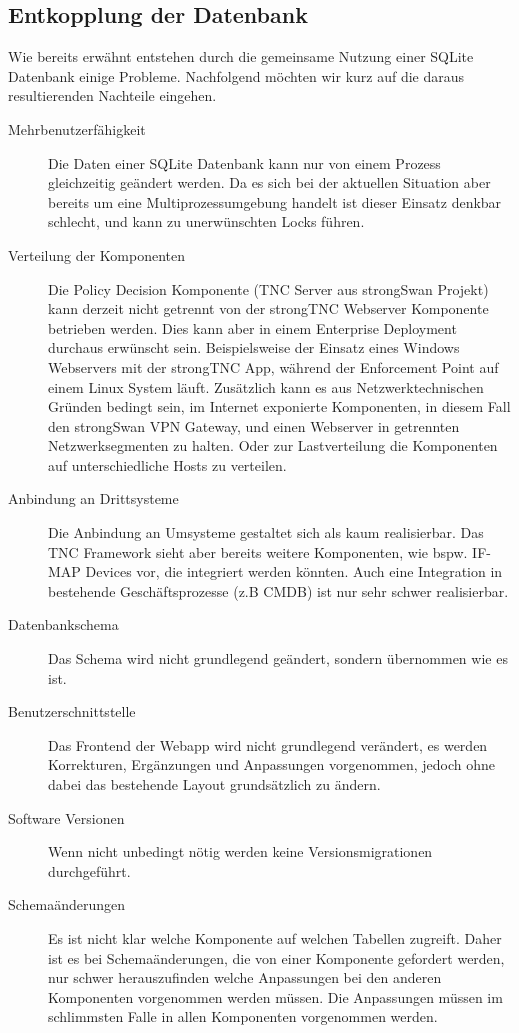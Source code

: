 \subsection{Entkopplung der Datenbank}
Wie bereits erwähnt entstehen durch die gemeinsame Nutzung einer SQLite
Datenbank einige Probleme. Nachfolgend möchten wir kurz auf die daraus
resultierenden Nachteile eingehen.

\begin{description}
	\item[Mehrbenutzerfähigkeit] Die Daten einer SQLite Datenbank kann nur von
	einem Prozess gleichzeitig geändert werden. Da es sich bei der aktuellen
	Situation aber bereits um eine Multiprozessumgebung handelt ist dieser Einsatz
	denkbar schlecht, und kann zu unerwünschten Locks führen.

	\item[Verteilung der Komponenten] Die Policy Decision Komponente (TNC Server
	aus strongSwan Projekt) kann derzeit nicht getrennt von der strongTNC Webserver
	Komponente betrieben werden. Dies kann aber in einem Enterprise Deployment
	durchaus erwünscht sein. Beispielsweise der Einsatz eines Windows Webservers
	mit der strongTNC App, während der Enforcement Point auf einem Linux System
	läuft. Zusätzlich kann es aus Netzwerktechnischen Gründen bedingt sein, im
	Internet exponierte Komponenten, in diesem Fall den strongSwan VPN Gateway, und
	einen Webserver in getrennten Netzwerksegmenten zu halten. Oder zur
	Lastverteilung die Komponenten auf unterschiedliche Hosts zu verteilen.

	\item[Anbindung an Drittsysteme] Die Anbindung an Umsysteme gestaltet sich als
	kaum realisierbar. Das TNC Framework sieht aber bereits weitere Komponenten,
	wie bspw. IF-MAP Devices vor, die integriert werden könnten. Auch eine
	Integration in bestehende Geschäftsprozesse (z.B CMDB) ist nur sehr schwer
	realisierbar.
\end{description} 

\begin{description}
	\item[Datenbankschema] Das Schema wird nicht grundlegend
	geändert, sondern übernommen wie es ist.

	\item[Benutzerschnittstelle] Das Frontend der Webapp wird nicht grundlegend
	verändert, es werden Korrekturen, Ergänzungen und Anpassungen vorgenommen,
	jedoch ohne dabei das bestehende Layout grundsätzlich zu ändern.

	\item[Software Versionen] Wenn nicht unbedingt nötig werden keine
	Versionsmigrationen durchgeführt.

	\item[Schemaänderungen] Es ist nicht klar welche Komponente auf welchen
	Tabellen zugreift. Daher ist es bei Schemaänderungen, die von einer Komponente
	gefordert werden, nur schwer herauszufinden welche Anpassungen bei den anderen
	Komponenten vorgenommen werden müssen. Die Anpassungen müssen im schlimmsten
	Falle in allen Komponenten vorgenommen werden.
\end{description}

